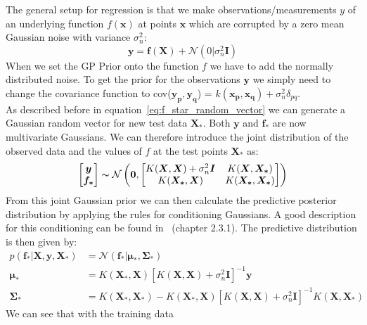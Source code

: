 \documentclass{article}
\begin{document}
The general setup for regression is that we make observations/measurements $y$ of an underlying function $f(\bm{x})$ at points $\bm{x}$ which are corrupted by a zero mean Gaussian noise with variance $\sigma_n^2$:
\begin{equation}
    \bm{y} = \bm{f}(\bm{X}) + \mathcal{N}(0|\sigma_n^2 \bm{I})
\end{equation}
When we set the GP Prior onto the function $f$ we have to add the normally distributed noise. To get the prior for the observations $\bm{y}$ we simply need to change the covariance function to cov($\bm{y_p,y_q}$) = $k(\bm{x_p,x_q}) + \sigma_n^2\delta_{pq}$.\\
As described before in equation~\ref{eq:f_star_random_vector} we can generate a Gaussian random vector for new test data $\bm{X_*}$. Both $\bm{y}$ and $\bm{f_*}$ are now multivariate Gaussians. We can therefore introduce the joint distribution of the observed data and the values of $f$ at the test points $\bm{X_*}$ as:
\begin{equation}
    \begin{aligned}
        \begin{bmatrix}
            \bm{y}\\
            \bm{f_*}
        \end{bmatrix}
        \thicksim  \mathcal{N}\left(\bm{0},
        \begin{bmatrix}
            K(\bm{X},\bm{X}) + \sigma_n^2 \bm{I} & K(\bm{X},\bm{X_*})\\
            K(\bm{X_*},\bm{X}) & K(\bm{X_*},\bm{X_*})
        \end{bmatrix}
        \right)
    \end{aligned}
\end{equation}
From this joint Gaussian prior we can then calculate the predictive posterior distribution by applying the rules for conditioning Gaussians. A good description for this conditioning can be found in~\cite{bishop} (chapter 2.3.1). The predictive distribution is then given by:
\begin{equation}
    \begin{aligned}
        \label{eq:general_kernel}
        p(\bm{f_*}|\bm{X},\bm{y},\bm{X_*}) &= \mathcal{N}(\bm{f_*|\bm{\mu_*}},\bm{\Sigma_*})\\
        \bm{\mu_*} &=  K(\bm{X_*},\bm{X}){[K(\bm{X},\bm{X}) + \sigma_n^2 \bm{I}]}^{-1} \bm{y}\\
        \bm{\Sigma_*} &= K(\bm{X_*},\bm{X_*}) - K(\bm{X_*},\bm{X}){[K(\bm{X},\bm{X}) + \sigma_n^2 \bm{I}]}^{-1}K(\bm{X},\bm{X_*})
    \end{aligned}
\end{equation}
We can see that with the training data
\end{document}
